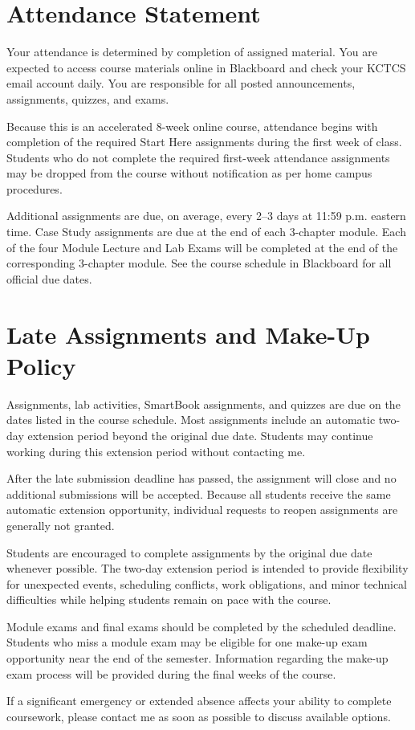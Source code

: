 \section*{Attendance Statement}

Your attendance is determined by completion of assigned material. You are expected to access course materials online in Blackboard and check your KCTCS email account daily. You are responsible for all posted announcements, assignments, quizzes, and exams.

Because this is an accelerated 8-week online course, attendance begins with completion of the required Start Here assignments during the first week of class. Students who do not complete the required first-week attendance assignments may be dropped from the course without notification as per home campus procedures.

Additional assignments are due, on average, every 2--3 days at 11:59 p.m. eastern time. Case Study assignments are due at the end of each 3-chapter module. Each of the four Module Lecture and Lab Exams will be completed at the end of the corresponding 3-chapter module. See the course schedule in Blackboard for all official due dates.

\section*{Late Assignments and Make-Up Policy}

Assignments, lab activities, SmartBook assignments, and quizzes are due on the dates listed in the course schedule. Most assignments include an automatic two-day extension period beyond the original due date. Students may continue working during this extension period without contacting me.

After the late submission deadline has passed, the assignment will close and no additional submissions will be accepted. Because all students receive the same automatic extension opportunity, individual requests to reopen assignments are generally not granted.

Students are encouraged to complete assignments by the original due date whenever possible. The two-day extension period is intended to provide flexibility for unexpected events, scheduling conflicts, work obligations, and minor technical difficulties while helping students remain on pace with the course.

Module exams and final exams should be completed by the scheduled deadline. Students who miss a module exam may be eligible for one make-up exam opportunity near the end of the semester. Information regarding the make-up exam process will be provided during the final weeks of the course.

If a significant emergency or extended absence affects your ability to complete coursework, please contact me as soon as possible to discuss available options.